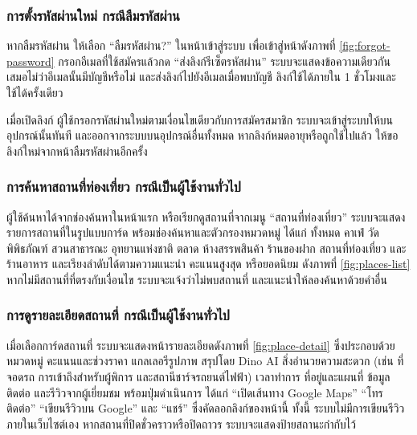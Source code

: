 \subsubsection{การตั้งรหัสผ่านใหม่ กรณีลืมรหัสผ่าน}

หากลืมรหัสผ่าน ให้เลือก ``ลืมรหัสผ่าน?'' ในหน้าเข้าสู่ระบบ เพื่อเข้าสู่หน้าดังภาพที่ \ref{fig:forgot-password} กรอกอีเมลที่ใช้สมัครแล้วกด ``ส่งลิงก์รีเซ็ตรหัสผ่าน'' ระบบจะแสดงข้อความเดียวกันเสมอไม่ว่าอีเมลนั้นมีบัญชีหรือไม่ และส่งลิงก์ไปยังอีเมลเมื่อพบบัญชี ลิงก์ใช้ได้ภายใน 1 ชั่วโมงและใช้ได้ครั้งเดียว


เมื่อเปิดลิงก์ ผู้ใช้กรอกรหัสผ่านใหม่ตามเงื่อนไขเดียวกับการสมัครสมาชิก ระบบจะเข้าสู่ระบบให้บนอุปกรณ์นั้นทันที และออกจากระบบบนอุปกรณ์อื่นทั้งหมด หากลิงก์หมดอายุหรือถูกใช้ไปแล้ว ให้ขอลิงก์ใหม่จากหน้าลืมรหัสผ่านอีกครั้ง

\subsubsection{การค้นหาสถานที่ท่องเที่ยว กรณีเป็นผู้ใช้งานทั่วไป}

ผู้ใช้ค้นหาได้จากช่องค้นหาในหน้าแรก หรือเรียกดูสถานที่จากเมนู ``สถานที่ท่องเที่ยว'' ระบบจะแสดงรายการสถานที่ในรูปแบบการ์ด พร้อมช่องค้นหาและตัวกรองหมวดหมู่ ได้แก่ ทั้งหมด คาเฟ่ วัด พิพิธภัณฑ์ สวนสาธารณะ อุทยานแห่งชาติ ตลาด ห้างสรรพสินค้า ร้านของฝาก สถานที่ท่องเที่ยว และร้านอาหาร และเรียงลำดับได้ตามความแนะนำ คะแนนสูงสุด หรือยอดนิยม ดังภาพที่ \ref{fig:places-list} หากไม่มีสถานที่ที่ตรงกับเงื่อนไข ระบบจะแจ้งว่าไม่พบสถานที่ และแนะนำให้ลองค้นหาด้วยคำอื่น


\subsubsection{การดูรายละเอียดสถานที่ กรณีเป็นผู้ใช้งานทั่วไป}

เมื่อเลือกการ์ดสถานที่ ระบบจะแสดงหน้ารายละเอียดดังภาพที่ \ref{fig:place-detail} ซึ่งประกอบด้วยหมวดหมู่ คะแนนและช่วงราคา แกลเลอรีรูปภาพ สรุปโดย Dino AI สิ่งอำนวยความสะดวก (เช่น ที่จอดรถ การเข้าถึงสำหรับผู้พิการ และสถานีชาร์จรถยนต์ไฟฟ้า) เวลาทำการ ที่อยู่และแผนที่ ข้อมูลติดต่อ และรีวิวจากผู้เยี่ยมชม พร้อมปุ่มดำเนินการ ได้แก่ ``เปิดเส้นทาง Google Maps'' ``โทรติดต่อ'' ``เขียนรีวิวบน Google'' และ ``แชร์'' ซึ่งคัดลอกลิงก์ของหน้านี้ ทั้งนี้ ระบบไม่มีการเขียนรีวิวภายในเว็บไซต์เอง หากสถานที่ปิดชั่วคราวหรือปิดถาวร ระบบจะแสดงป้ายสถานะกำกับไว้


